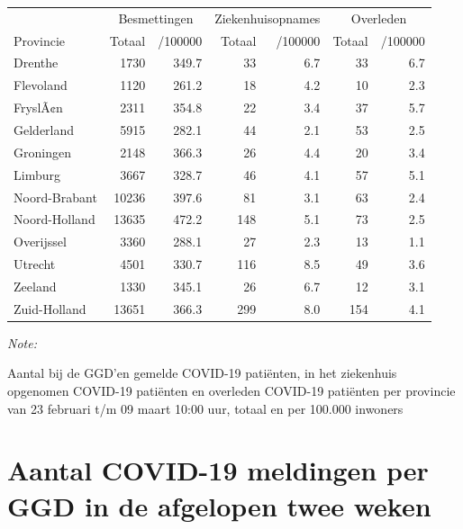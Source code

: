 \documentclass[
  english,
  man,floatsintext]{apa6}
\begin{document}
\begin{table}
\centering
\begin{threeparttable}
\begin{tabular}{lrrrrrr}
\toprule
\multicolumn{1}{c}{ } & \multicolumn{2}{c}{Besmettingen} & \multicolumn{2}{c}{Ziekenhuisopnames} & \multicolumn{2}{c}{Overleden} \\
\cmidrule(l{3pt}r{3pt}){2-3} \cmidrule(l{3pt}r{3pt}){4-5} \cmidrule(l{3pt}r{3pt}){6-7}
Provincie & Totaal & /100000 & Totaal & /100000 & Totaal & /100000\\
\midrule
Drenthe & 1730 & 349.7 & 33 & 6.7 & 33 & 6.7\\
Flevoland & 1120 & 261.2 & 18 & 4.2 & 10 & 2.3\\
FryslÃ¢n & 2311 & 354.8 & 22 & 3.4 & 37 & 5.7\\
Gelderland & 5915 & 282.1 & 44 & 2.1 & 53 & 2.5\\
Groningen & 2148 & 366.3 & 26 & 4.4 & 20 & 3.4\\
Limburg & 3667 & 328.7 & 46 & 4.1 & 57 & 5.1\\
Noord-Brabant & 10236 & 397.6 & 81 & 3.1 & 63 & 2.4\\
Noord-Holland & 13635 & 472.2 & 148 & 5.1 & 73 & 2.5\\
Overijssel & 3360 & 288.1 & 27 & 2.3 & 13 & 1.1\\
Utrecht & 4501 & 330.7 & 116 & 8.5 & 49 & 3.6\\
Zeeland & 1330 & 345.1 & 26 & 6.7 & 12 & 3.1\\
Zuid-Holland & 13651 & 366.3 & 299 & 8.0 & 154 & 4.1\\
\bottomrule
\end{tabular}
\begin{tablenotes}
\item \textit{Note: } 
\item Aantal bij de GGD’en gemelde COVID-19 patiënten, in het ziekenhuis opgenomen COVID-19 patiënten en overleden COVID-19 patiënten per provincie van 23 februari t/m 09 maart 10:00 uur, totaal en per 100.000 inwoners
\end{tablenotes}
\end{threeparttable}
\end{table}

\newpage

\hypertarget{aantal-covid-19-meldingen-per-ggd-in-de-afgelopen-twee-weken}{%
\section{Aantal COVID-19 meldingen per GGD in de afgelopen twee weken}\label{aantal-covid-19-meldingen-per-ggd-in-de-afgelopen-twee-weken}}
\end{document}
